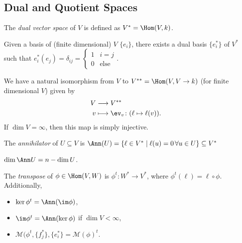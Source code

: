 \documentclass{notes}
\begin{document}
\subsection{Dual and Quotient Spaces}

\begin{defn}
    The \emph{dual vector space} of $V$ is defined as $V^*=\Hom(V,k)$.
\end{defn}

\begin{theorem}
    Given a basis of (finite dimensional) $V$ $\{e_i\} $, there exists a dual basis $\{e_i^*\} $ of $V^*$ such that $e_i^*(e_j)=\delta_{ij}=\begin{cases}1 & i=j \\ 0 & \text{else} \end{cases}$.
\end{theorem}

\begin{theorem}
    We have a natural isomorphism from $V$ to $V^{**}=\Hom(V,V\to k)$ (for finite dimensional $V$) given by
    \begin{align*}
        V &\longrightarrow V^{**} \\
        v &\longmapsto \ev_v\colon(\ell \mapsto \ell (v))
    .\end{align*}
    If $\dim V=\infty $, then this map is simply injective.
\end{theorem}

\begin{defn}
    The \emph{annihilator} of $U\subseteq V$ is $\Ann(U)=\left\{ \ell \in V^* \mid  \ell (u)=0\,\forall u\in U \right\}\subseteq V^* $
\end{defn}

\begin{corollary}
    $\dim\Ann U=n-\dim U$.
\end{corollary}

\begin{defn}
    The \emph{transpose} of $\phi \in \Hom(V,W)$ is $\phi^t \colon W^* \to V^*$, where $\phi^t(\ell )=\ell \circ\phi $. Additionally,
    \begin{itemize}
        \item $\ker\phi ^t=\Ann(\im\phi )$,
        \item $\im\phi^t=\Ann(\ker\phi ) $ if $\dim V<\infty $,
        \item $\mathcal{M} (\phi ^t,\{f_j^*\} ,\{e_i^*\} =\mathcal{M} (\phi )^t$.
    \end{itemize}
\end{defn}
\end{document}
